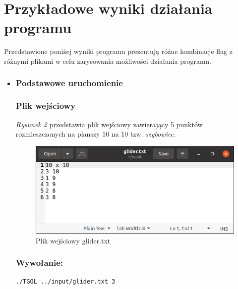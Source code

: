 \documentclass[11pt,a4paper]{report}
\begin{document}
\section{Przykładowe wyniki działania programu}\label{sec:teskt}
Przedstawione poniżej wyniki programu prezentują różne kombinacje flag z różnymi plikami w celu zarysowania możliwości działania programu.
\begin {itemize}
\item \subsubsection {Podstawowe uruchomienie}
\subsubsection {Plik wejściowy}
\textsl{Rysunek 2} przedstawia plik wejściowy zawierający 5 punktów rozmieszczonych na planszy 10 na 10 tzw. \textsl{szybowiec}.
\begin{figure}[!ht]
\centerline{\includegraphics{img/input_glider.png}}
\caption{Plik wejściowy glider.txt}
\end{figure}
\subsubsection {Wywołanie:}
\texttt{./TGOL ../input/glider.txt 3}

\end{itemize}
\end{document}

